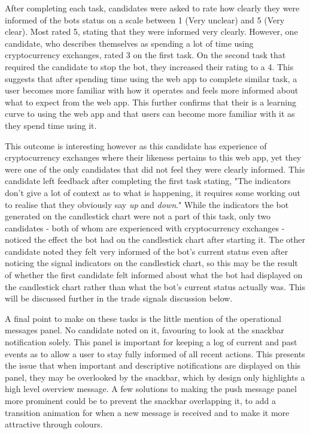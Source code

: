 After completing each task, candidates were asked to rate how clearly they were informed of the bots status on a scale between 1 (Very unclear) and 5 (Very clear). Most rated 5, stating that they were informed very clearly. However, one candidate, who describes themselves as spending a lot of time using cryptocurrency exchanges, rated 3 on the first task. On the second task that required the candidate to stop the bot, they increased their rating to a 4. This suggests that after spending time using the web app to complete similar task, a user becomes more familiar with how it operates and feels more informed about what to expect from the web app. This further confirms that their is a learning curve to using the web app and that users can become more familiar with it as they spend time using it.

This outcome is interesting however as this candidate has experience of cryptocurrency exchanges where their likeness pertains to this web app, yet they were one of the only candidates that did not feel they were clearly informed. This candidate left feedback after completing the first task stating, "The indicators don't give a lot of context as to what is happening, it requires some working out to realise that they obviously say \textit{up} and \textit{down}." While the indicators the bot generated on the candlestick chart were not a part of this task, only two candidates - both of whom are experienced with cryptocurrency exchanges - noticed the effect the bot had on the candlestick chart after starting it. The other candidate noted they felt very informed of the bot's current status even after noticing the signal indicators on the candlestick chart, so this may be the result of whether the first candidate felt informed about what the bot had displayed on the candlestick chart rather than what the bot's current status actually was. This will be discussed further in the trade signals discussion below.

A final point to make on these tasks is the little mention of the operational messages panel. No candidate noted on it, favouring to look at the snackbar notification solely. This panel is important for keeping a log of current and past events as to allow a user to stay fully informed of all recent actions. This presents the issue that when important and descriptive notifications are displayed on this panel, they may be overlooked by the snackbar, which by design only highlights a high level overview message. A few solutions to making the push message panel more prominent could be to prevent the snackbar overlapping it, to add a transition animation for when a new message is received and to make it more attractive through colours. 


